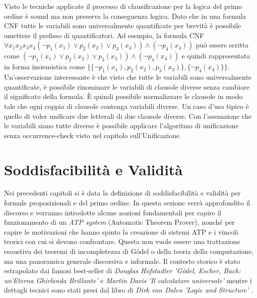 \documentclass[./main.tex]{subfiles}
\begin{document}
Visto le tecniche applicate il processo di clausificazione per la logica del primo ordine è sound ma non preserva la conseguenza logica.
Dato che in una formula CNF tutte le variabili sono universalmente quantificate per brevità è possibile omettere il prefisso di quantificatori.
Ad esempio, la formula CNF $\forall x_1 x_2 x_3 x_4 (\lnot p_1(x_1) \lor p_2(x_2) \lor p_3(x_3)) \land (\lnot p_4(x_4))$ può essere scritta come
$(\lnot p_1(x_1) \lor p_2(x_2) \lor p_3(x_3)) \land (\lnot p_4(x_4))$ e quindi rappresentata
in forma insiemistica come $\{\{\lnot p_1(x_1), p_2(x_2), p_3(x_3)\}, \{\lnot p_4(x_4)\}\}$.
Un'osservazione interessante è che visto che tutte le variabili sono universalmente quantificate, è possibile rinominare le variabili di clausole diverse senza
cambiare il significato della formula. È quindi possibile normalizzare le clausole in modo tale che ogni coppia di clausole contenga variabili diverse.
Un caso d'uso tipico è quello di voler unificare due letterali di due clausole diverse. Con l'assunzione che le variabili siano tutte diverse è possibile
applicare l'algoritmo di unificazione senza occurrence-check visto nel capitolo sull'Unificazione.



\section{Soddisfacibilità e Validità} \label{sec:sat_val}
Nei precedenti capitoli si è data la definizione di soddisfacibilità e validità per formule proposizionali e del primo ordine.
In questa sezione verrà approfondito il discorso e verranno introdotte alcune nozioni fondamentali per 
capire il funzionamento di un \textit{ATP system} (Automatic Theorem Prover), nonché 
per capire le motivazioni che hanno spinto la creazione di sistemi ATP e i vincoli teorici con cui si devono confrontare.
Questa non vuole essere una trattazione esaustiva dei teoremi di incompletezza di Gödel o
della teoria della computazione,
ma una panoramica generale discorsiva e informale.
Il contesto storico è stato estrapolato dai famosi best-seller 
di \textit{Douglas Hofstadter} \textit{'Gödel, Escher, Bach: un'Eterna Ghirlanda Brillante'} \cite{hofstader_Godel_Escher_Bach}
e \textit{Martin Davis} \textit{'Il calcolatore universale'} \cite{davisCalcolatoreUniversale}
mentre i dettagli tecnici sono stati presi dal libro di \textit{Dirk van Dalen} \textit{'Logic and Structure'} \cite{LogicAndStructure}.
\end{document}
